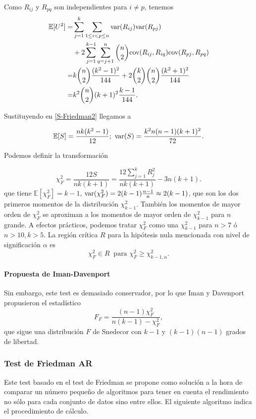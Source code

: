 	Como $R_{ij}$ y $R_{pq}$ son independientes para $i \neq p$, tenemos
	\begin{align*}
		\mathbb{E}[U^2] =& \sum\limits_{j=1}^k
					\sum\limits_{1 \leq i < p \leq n}
						\text{var}(R_{ij})\text{var}(R_{pj}) \\
			 &+ 2 
			    \sum\limits_{j=1}^{k-1}
			      \sum\limits_{q=j+1}^n
			    {n \choose 2}
				\text{cov}(R_{ij}, R_{iq}) \text{cov}(R_{pj}, R_{pq}) \\
			=& k {n \choose 2} \frac{(k^2-1)^2}{144} +
				2{k \choose 2}{n \choose 2} 
					\frac{(k^2+1)^2}{144} \\
			=& k^2 {n \choose 2} (k+1)^2 \frac{k-1}{144}.
	\end{align*}	
	
	Sustituyendo en \ref{S-Friedman2} llegamos a 
	
	\[ \mathbb{E}[S] = \frac{nk(k^2-1)}{12}; \ 
		\var(S)= \frac{k^2n(n-1)(k+1)^2}{72} .\]
	
	Podemos definir la transformación
	
	\[ \chi^2_F = \frac{12S}{nk(k+1)} = 
	\frac{12 \sum\limits_{j=1}^k R_j^2}{nk(k+1)} -3n(k+1) .
	\]
	que tiene $\mathbb{E}[\chi^2_F] = k-1$, $\text{var}(\chi^2_F)= 2(k-1)
\frac{n-1}{n} \approx 2(k-1)$, que son los dos primeros 
momentos de la distribución $\chi^2_{k-1}$. También los 
momentos de mayor orden de $\chi^2_F$ se aproximan a los 
momentos de mayor orden de $\chi^2_{k-1}$ para $n$ grande. A 
efectos prácticos, podemos tratar $\chi^2_F$ como una $
\chi^2_{k-1}$ para $n>7$ ó $n>10, k>5$. La región crítica $R$
para la hipótesis nula mencionada con nivel de significación 
$\alpha$ es
	\[ 
		\chi^2_F \in R \ \text{ para } 
			\chi^2_F \geq \chi_{k-1,\alpha}^2 .
	\]
	
\paragraph{Propuesta de Iman-Davenport} Sin embargo, este
test es demasiado conservador, por lo que Iman y Davenport
propusieron el estadístico
	\[
		F_F = \frac{(n-1)\chi^2_F}{n(k-1) - \chi^2_F},
	\]
	que sigue una distribución $F$ de Snedecor con $k-1$ y
$(k-1)(n-1)$ grados de libertad.
	
	
\subsubsection{Test de Friedman AR}
	Este test basado en el test de Friedman se propone como
solución a la hora de comparar un número pequeño de 
algoritmos para tener en cuenta el rendimiento no sólo 
para cada conjunto de datos sino entre ellos. El
siguiente algoritmo indica el procedimiento de cálculo.\\
	
